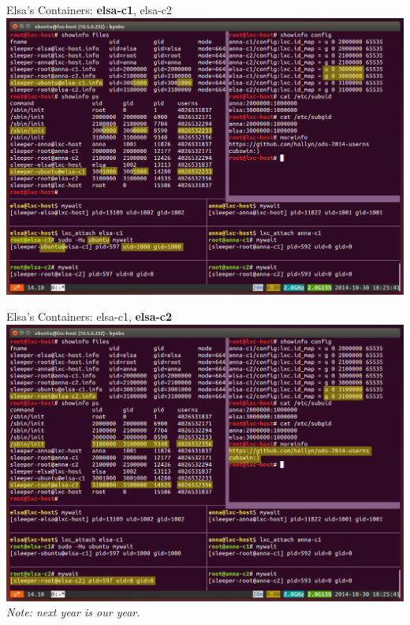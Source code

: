 \documentclass{beamer}
\begin{document}
\begin{frame}
Elsa's Containers: \textbf{elsa-c1}, elsa-c2
\includegraphics[width=\textwidth]{screen-elsa-c1.png}
\end{frame}

\begin{frame}
Elsa's Containers: elsa-c1, \textbf{elsa-c2}
\includegraphics[width=\textwidth]{screen-elsa-c2.png}
\textit{Note: next year is our year.}
\end{frame}
\end{document}
